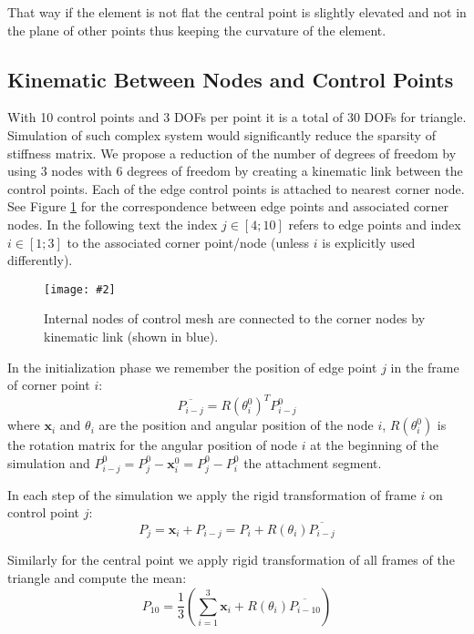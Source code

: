 \documentclass{egpubl}
\newcommand{\Figure}[3]{%
\begin{figure}[htb]
  \centering
  \texttt{[image: \#2]}
  \caption{\label{fig-#2}#3}
\end{figure}}
\begin{document}
That way if the element is not flat the central point is slightly elevated
and not in the plane of other points thus keeping the curvature of the
element.


\subsection{Kinematic Between Nodes and Control Points } %

With 10 control points and 3 DOFs per point it is a total of 30 DOFs for triangle.
Simulation of such complex system would significantly reduce the sparsity of stiffness matrix.
We propose a reduction of the number of degrees of freedom by using 3 nodes with 6 degrees of freedom
by creating a kinematic link between the control points.
Each of the edge control points is attached to nearest corner node. See Figure
\ref{fig-segments2} for the correspondence between edge points and
associated corner nodes. 
In the following text the index $j \in [4;10]$ refers to edge points and index $i \in [1;3]$ to the associated corner point/node (unless $i$ is explicitly used differently).

\Figure{0.8\linewidth}{segments2}
{Internal nodes of control mesh are connected to the corner nodes by kinematic link (shown in blue).}

In the initialization phase we remember the position of edge point $j$ in the frame of corner point $i$:
%
\begin{equation}
    \overline{P_{i-j}} = R(\theta_i^0)^T P_{i-j}^0
\end{equation}
%
where
$\mathbf{x}_i$ and $\theta_i$ are the position and angular position of the node $i$,
$R(\theta_i^0)$ is the rotation matrix for the angular position of node $i$ at the beginning of the simulation and
$P_{i-j}^0 = P_j^0 - \mathbf{x}_i^0 = P_j^0 - P_i^0$ the attachment segment.

In each step of the simulation we
apply the rigid transformation of frame $i$ on control point $j$:
%
\begin{equation}
    P_j = \mathbf{x}_i + P_{i-j} = P_i + R(\theta_i) \overline{P_{i-j}}
\end{equation}

Similarly for the central point we apply rigid transformation of all frames of the triangle and compute the mean:
%
\begin{equation}\label{eq-central2}
    P_{10} =  \frac{1}{3}\left( \sum_{i=1}^3 \mathbf{x}_i + R(\theta_i) \overline{P_{i-10}} \right)
\end{equation}
\end{document}
